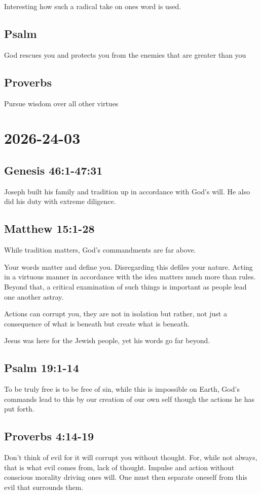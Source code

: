 Interesting how such a radical take on ones word is used.
\subsection{Psalm}
God rescues you and protects you from the enemies that are greater than you
\subsection{Proverbs}
Pursue wisdom over all other virtues



\section{2026-24-03}
\subsection{Genesis 46:1-47:31}
Joseph built his family and tradition up in accordance with God's will. He also did his duty with extreme diligence.

\subsection{Matthew 15:1-28}
While tradition matters, God's commandments are far above.

Your words matter and define you. Disregarding this defiles your nature. Acting in a virtuous manner in accordance with the idea matters much more than
rules. Beyond that, a critical examination of such things is important as people lead one another astray.

Actions can corrupt you, they are not in isolation but rather, not just a consequence of what is beneath but create what is beneath.

Jesus was here for the Jewish people, yet his words go far beyond.

\subsection{Psalm 19:1-14}
To be truly free is to be free of sin, while this is impossible on Earth, God's commands lead to this by our creation of our own self though the actions
he has put forth.

\subsection{Proverbs 4:14-19}
Don't think of evil for it will corrupt you without thought. For, while not always, that is what evil comes from, lack of thought. Impulse and action
without conscious morality driving ones will. One must then separate oneself from this evil that surrounds them.


